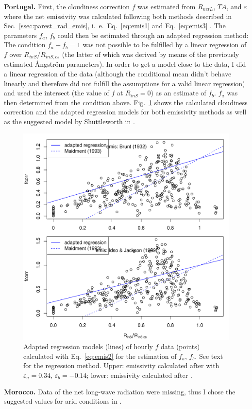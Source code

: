 \documentclass{scrreprt}
\begin{document}
\noindent
\textbf{Portugal.}
First, the cloudiness correction $f$ was estimated from $R_{netL}$, $TA$, and $\varepsilon$ where the net emissivity was calculated following both methods described in Sec.~\ref{ssec:parest_rad_emis}, i.~e.\ Eq.~\eqref{eq:emis1} \citep{brunt32} and Eq.~\eqref{eq:emis3} \citep{idso69}.
The parameters $f_a$, $f_b$ could then be estimated through an adapted regression method:
The condition $f_a + f_b = 1$ was not possible to be fulfilled by a linear regression of $f$ over $R_{inS}/R_{inS,cs}$ (the latter of which was derived by means of the previously estimated {\AA}ngstr\"om parameters).
In order to get a model close to the data, I did a linear regression of the data (although the conditional mean didn't behave linearly and therefore did not fulfill the assumptions for a valid linear regression) and used the intersect (the value of $f$ at $R_{inS} = 0$) as an estimate of $f_b$.
$f_a$ was then determined from the condition above.
Fig.~\ref{fig:portugal_fcorr} shows the calculated cloudiness correction and the adapted regression models for both emissivity methods as well as the suggested model by Shuttleworth in \citet{maidment93}.

\begin{figure}[H]
  \centering
  \includegraphics[width=0.6\hsize]{./fig/plot_fcorr_both.pdf}
  \caption{Adapted regression models (lines) of hourly $f$ data (points) calculated with Eq.~\eqref{eq:emis2} for the estimation of $f_a$, $f_b$.
           See text for the regression method.
           Upper: emissivity calculated after \citet{brunt32} with $\varepsilon_a = 0.34$, $\varepsilon_b = -0.14$; lower: emissivity calculated after \citet{idso69}.}
  \label{fig:portugal_fcorr}
\end{figure}

\noindent
\textbf{Morocco.}
Data of the net long-wave radiation were missing, thus I chose the suggested values for arid conditions in \citet{maidment93}.
\end{document}
